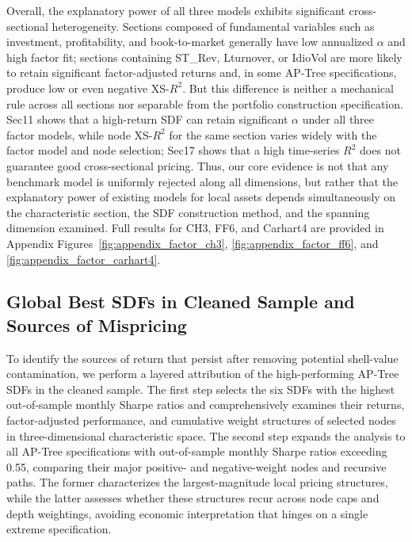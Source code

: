 \documentclass[12pt]{article}
\begin{document}
Overall, the explanatory power of all three models exhibits significant cross-sectional heterogeneity. Sections composed of fundamental variables such as investment, profitability, and book-to-market generally have low annualized \(\alpha\) and high factor fit; sections containing ST\_Rev, Lturnover, or IdioVol are more likely to retain significant factor-adjusted returns and, in some AP-Tree specifications, produce low or even negative XS-\(R^2\). But this difference is neither a mechanical rule across all sections nor separable from the portfolio construction specification. Sec11 shows that a high-return SDF can retain significant \(\alpha\) under all three factor models, while node XS-\(R^2\) for the same section varies widely with the factor model and node selection; Sec17 shows that a high time-series \(R^2\) does not guarantee good cross-sectional pricing. Thus, our core evidence is not that any benchmark model is uniformly rejected along all dimensions, but rather that the explanatory power of existing models for local assets depends simultaneously on the characteristic section, the SDF construction method, and the spanning dimension examined. Full results for CH3, FF6, and Carhart4 are provided in Appendix Figures~\ref{fig:appendix_factor_ch3}, \ref{fig:appendix_factor_ff6}, and \ref{fig:appendix_factor_carhart4}.

\subsection{Global Best SDFs in Cleaned Sample and Sources of Mispricing}
\label{subsec:cleaned_best_sdf}

To identify the sources of return that persist after removing potential shell-value contamination, we perform a layered attribution of the high-performing AP-Tree SDFs in the cleaned sample. The first step selects the six SDFs with the highest out-of-sample monthly Sharpe ratios and comprehensively examines their returns, factor-adjusted performance, and cumulative weight structures of selected nodes in three-dimensional characteristic space. The second step expands the analysis to all AP-Tree specifications with out-of-sample monthly Sharpe ratios exceeding 0.55, comparing their major positive- and negative-weight nodes and recursive paths. The former characterizes the largest-magnitude local pricing structures, while the latter assesses whether these structures recur across node caps and depth weightings, avoiding economic interpretation that hinges on a single extreme specification.
\end{document}
